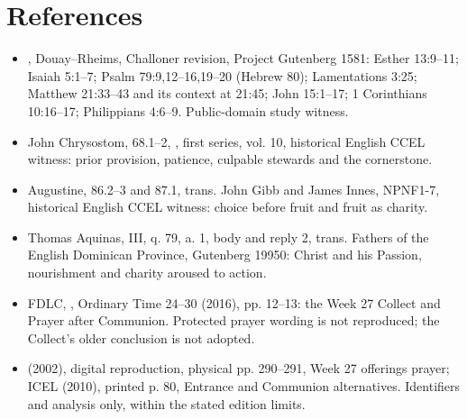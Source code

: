 \section{References}
\begin{itemize}
\item {}, Douay--Rheims, Challoner revision, Project Gutenberg 1581: Esther 13:9--11; Isaiah 5:1--7; Psalm 79:9,12--16,19--20 (Hebrew 80); Lamentations 3:25; Matthew 21:33--43 and its context at 21:45; John 15:1--17; 1 Corinthians 10:16--17; Philippians 4:6--9. Public-domain study witness.
\item John Chrysostom,  68.1--2, , first series, vol. 10, historical English CCEL witness: prior provision, patience, culpable stewards and the cornerstone.
\item Augustine,  86.2--3 and 87.1, trans. John Gibb and James Innes, NPNF1-7, historical English CCEL witness: choice before fruit and fruit as charity.
\item Thomas Aquinas,  III, q. 79, a. 1, body and reply 2, trans. Fathers of the English Dominican Province, Gutenberg 19950: Christ and his Passion, nourishment and charity aroused to action.
\item FDLC, , Ordinary Time 24--30 (2016), pp. 12--13: the Week 27 Collect and Prayer after Communion. Protected prayer wording is not reproduced; the Collect's older conclusion is not adopted.
\item {} (2002), digital reproduction, physical pp. 290--291, Week 27 offerings prayer; ICEL  (2010), printed p. 80, Entrance and Communion alternatives. Identifiers and analysis only, within the stated edition limits.
\end{itemize}
